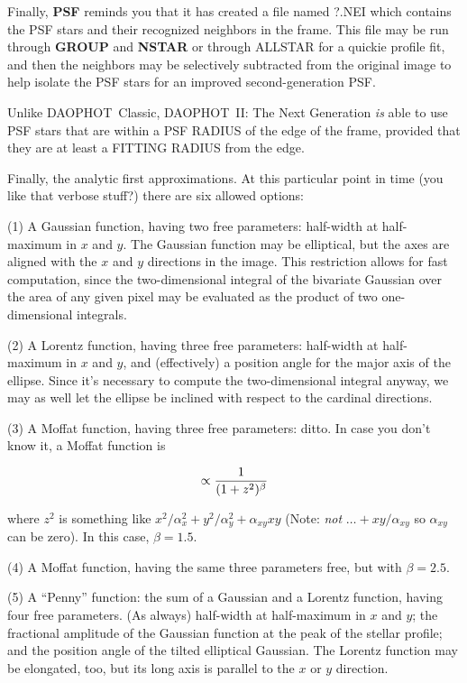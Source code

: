 Finally, {\bf PSF} reminds you that it has created a file named
?.NEI which contains the PSF stars and their recognized neighbors
in the frame.  This file may be run through {\bf GROUP} and
{\bf NSTAR} or through ALLSTAR for a quickie profile fit, and
then the neighbors may be selectively subtracted from the original
image to help isolate the PSF stars for an improved second-generation
PSF.

Unlike DAOPHOT~Classic, DAOPHOT~II: The Next Generation {\it is\/}
able to use PSF stars that are within a PSF RADIUS of the edge of
the frame, provided that they are at least a FITTING RADIUS from 
the edge.  

Finally, the analytic first approximations.  At this particular point
in time (you like that verbose stuff?) there are six allowed options:

\item{(1)} A Gaussian function, having two free parameters:  half-width
at half-maximum in $x$ and $y$.  The Gaussian function may be elliptical,
but the axes are aligned with the $x$ and $y$ directions in the image.
This restriction allows for fast computation, since the two-dimensional
integral of the bivariate Gaussian over the area of any given pixel
may be evaluated as the product of two one-dimensional integrals.

\item{(2)} A Lorentz function, having three free parameters: half-width
at half-maximum in $x$ and $y$, and (effectively) a position angle for
the major axis of the ellipse.  Since it's necessary to compute the
two-dimensional integral anyway, we may as well let the ellipse be
inclined with respect to the cardinal directions.

\item{(3)} A Moffat function, having three free parameters: ditto.
In case you don't know it, a Moffat function is

$$ \propto{1\over{(1 + z^2)^\beta}}$$

\item{} where $z^2$ is something like ${x^2/\alpha_x^2} +
{y^2/\alpha_y^2} + {\alpha_{xy} x y}$ (Note: {\it not\/} $\ldots +
{xy/\alpha_{xy}}$ so $\alpha_{xy}$ can be zero).  In this case, $\beta
= 1.5$.

\item{(4)} A Moffat function, having the same three parameters free,
but with $\beta = 2.5$.

\item{(5)}  A ``Penny'' function: the sum of a Gaussian and a Lorentz
function, having four free parameters.  (As always) half-width at
half-maximum in $x$ and $y$; the fractional amplitude of the
Gaussian function at the peak of the stellar profile; and the position
angle of the tilted elliptical Gaussian.  The Lorentz function may
be elongated, too, but its long axis is parallel to the $x$ or
$y$ direction.


